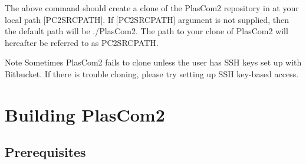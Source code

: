 The above command should create a clone of the Plas\+Com2 repository in at your local path \mbox{[}P\+C2\+S\+R\+C\+P\+A\+TH\mbox{]}. If \mbox{[}P\+C2\+S\+R\+C\+P\+A\+TH\mbox{]} argument is not supplied, then the default path will be ./\+Plas\+Com2. The path to your clone of Plas\+Com2 will hereafter be referred to as P\+C2\+S\+R\+C\+P\+A\+TH.

\begin{DoxyNote}{Note}
Sometimes Plas\+Com2 fails to clone unless the user has S\+SH keys set up with Bitbucket. If there is trouble cloning, please try setting up S\+SH key-\/based access.
\end{DoxyNote}
\hypertarget{getting_started_build}{}\section{Building Plas\+Com2}\label{getting_started_build}
\hypertarget{getting_started_prereq}{}\subsection{Prerequisites}\label{getting_started_prereq}

